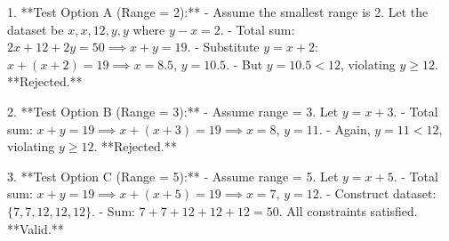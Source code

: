 1. **Test Option A (Range = 2):**
   - Assume the smallest range is 2. Let the dataset be \(x, x, 12, y, y\) where \(y - x = 2\).
   - Total sum: \(2x + 12 + 2y = 50 \implies x + y = 19\).
   - Substitute \(y = x + 2\): \(x + (x + 2) = 19 \implies x = 8.5\), \(y = 10.5\).
   - But \(y = 10.5 < 12\), violating \(y \geq 12\). **Rejected.**

2. **Test Option B (Range = 3):**
   - Assume range = 3. Let \(y = x + 3\).
   - Total sum: \(x + y = 19 \implies x + (x + 3) = 19 \implies x = 8\), \(y = 11\).
   - Again, \(y = 11 < 12\), violating \(y \geq 12\). **Rejected.**

3. **Test Option C (Range = 5):**
   - Assume range = 5. Let \(y = x + 5\).
   - Total sum: \(x + y = 19 \implies x + (x + 5) = 19 \implies x = 7\), \(y = 12\).
   - Construct dataset: \(\{7, 7, 12, 12, 12\}\).
   - Sum: \(7 + 7 + 12 + 12 + 12 = 50\). All constraints satisfied. **Valid.**

